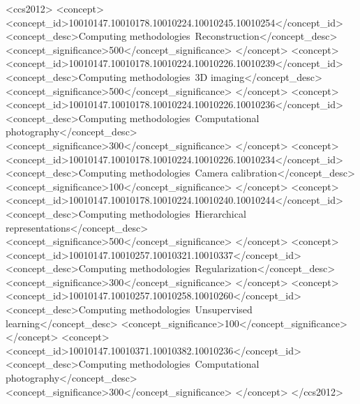 \documentclass[acmtog,nonacm]{acmart} \acmSubmissionID{0438}
\begin{document}
\begin{CCSXML}
<ccs2012>
<concept>
<concept_id>10010147.10010178.10010224.10010245.10010254</concept_id>
<concept_desc>Computing methodologies~Reconstruction</concept_desc>
<concept_significance>500</concept_significance>
</concept>
<concept>
<concept_id>10010147.10010178.10010224.10010226.10010239</concept_id>
<concept_desc>Computing methodologies~3D imaging</concept_desc>
<concept_significance>500</concept_significance>
</concept>
<concept>
<concept_id>10010147.10010178.10010224.10010226.10010236</concept_id>
<concept_desc>Computing methodologies~Computational photography</concept_desc>
<concept_significance>300</concept_significance>
</concept>
<concept>
<concept_id>10010147.10010178.10010224.10010226.10010234</concept_id>
<concept_desc>Computing methodologies~Camera calibration</concept_desc>
<concept_significance>100</concept_significance>
</concept>
<concept>
<concept_id>10010147.10010178.10010224.10010240.10010244</concept_id>
<concept_desc>Computing methodologies~Hierarchical representations</concept_desc>
<concept_significance>500</concept_significance>
</concept>
<concept>
<concept_id>10010147.10010257.10010321.10010337</concept_id>
<concept_desc>Computing methodologies~Regularization</concept_desc>
<concept_significance>300</concept_significance>
</concept>
<concept>
<concept_id>10010147.10010257.10010258.10010260</concept_id>
<concept_desc>Computing methodologies~Unsupervised learning</concept_desc>
<concept_significance>100</concept_significance>
</concept>
<concept>
<concept_id>10010147.10010371.10010382.10010236</concept_id>
<concept_desc>Computing methodologies~Computational photography</concept_desc>
<concept_significance>300</concept_significance>
</concept>
</ccs2012>
\end{CCSXML}








\maketitle
\end{document}
